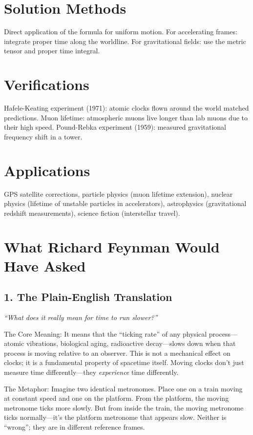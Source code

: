 \section*{Solution Methods}

Direct application of the formula for uniform motion. For accelerating frames: integrate proper time along the worldline. For gravitational fields: use the metric tensor and proper time integral.
\section*{Verifications}

Hafele-Keating experiment (1971): atomic clocks flown around the world matched predictions. Muon lifetime: atmospheric muons live longer than lab muons due to their high speed. Pound-Rebka experiment (1959): measured gravitational frequency shift in a tower.
\section*{Applications}

GPS satellite corrections, particle physics (muon lifetime extension), nuclear physics (lifetime of unstable particles in accelerators), astrophysics (gravitational redshift measurements), science fiction (interstellar travel).
\section*{What Richard Feynman Would Have Asked}

\subsection*{1. The Plain-English Translation}
\textit{``What does it really mean for time to run slower?''}

The Core Meaning: It means that the ``ticking rate'' of any physical process---atomic vibrations, biological aging, radioactive decay---slows down when that process is moving relative to an observer. This is not a mechanical effect on clocks; it is a fundamental property of spacetime itself. Moving clocks don't just measure time differently---they \emph{experience} time differently.

The Metaphor: Imagine two identical metronomes. Place one on a train moving at constant speed and one on the platform. From the platform, the moving metronome ticks more slowly. But from inside the train, the moving metronome ticks normally---it's the platform metronome that appears slow. Neither is ``wrong''; they are in different reference frames.

